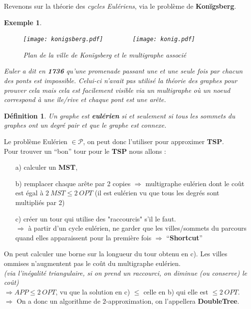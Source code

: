\documentclass[12pt]{article}
\newcommand{\titre}[1]{\textcolor{title}{#1}}
\newtheorem{de}{D\'efinition}[section]
\newtheorem{exemple}{Exemple}[section]
\begin{document}
Revenons sur la théorie des \textit{cycles Eulériens}, via le problème de \textbf{Konïgsberg}.
\begin{exemple}$ $ \\
\begin{figure}[H]
    \begin{center}
    \texttt{[image: konigsberg.pdf]}$\qquad\qquad$
    \texttt{[image: konig.pdf]}
    \caption{Plan de la ville de Konïgsberg et le multigraphe associé}
    \end{center}
\end{figure}

Euler a dit en \textbf{1736} qu'une promenade passant une et une seule fois par chacun des ponts est impossible.
Celui-ci n'avait pas utilisé la théorie des graphes pour prouver cela mais cela est facilement visible via un multigraphe où un noeud
correspond à une île/rive et chaque pont est une arête.
\end{exemple}

\begin{de}
Un graphe est \textbf{eulérien} si et seulement si tous les sommets du graphes ont un degré pair et que le graphe est connexe.
\end{de}

Le problème Eulérien $\in \mathcal{P}$, on peut donc l'utiliser pour approximer \textbf{\titre{TSP}}.\\
Pour trouver un ``bon'' tour pour le \textbf{\titre{TSP}} nous allons :
\begin{enumerate}
\item[a)] calculer un \textbf{\titre{MST}},
\item[b)] remplacer chaque arête par 2 copies $\Rightarrow$ multigraphe eulérien dont le coût est égal à $2\ MST\leq 2\ OPT$
(il est eulérien vu que tous les degrés sont multipliés par 2)
\item[c)] créer un tour qui utilise des "raccourcis" s'il le faut. \\
$\Rightarrow$ à partir d'un cycle eulérien, ne garder que les villes/sommets du parcours quand elles apparaissent pour la première fois
$\Rightarrow$ ``\textbf{Shortcut}''\\
\end{enumerate}
On peut calculer une borne sur la longueur du tour obtenu en c). Les villes ommises n'augmentent pas le coût du multigraphe eulérien. \\
\textit{(via l'inégalité triangulaire, si on prend un raccourci, on diminue (ou conserve) le coût)} \\
$\Rightarrow APP \leq 2\ OPT$, vu que la solution en c) $\leq$ celle en b) qui elle est $\leq 2\ OPT$. \\
$\Longrightarrow$ On a donc un algorithme de $2$-approximation, on l'appellera \textbf{DoubleTree}.
\end{document}
